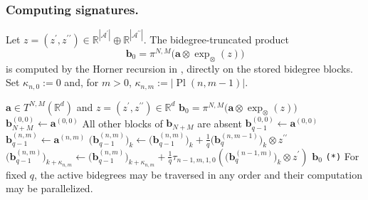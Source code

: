 \documentclass{amsart}
\theoremstyle{definition}
\theoremstyle{remark}
\begin{document}
\subsubsection{Computing signatures.}
Let $z=(z^{\prime},z^{\prime\prime})
    \in
    \mathbb{R}^{|\mathcal{A}^{\prime}|}
    \oplus
    \mathbb{R}^{|\mathcal{A}^{\prime\prime}|}.$
The bidegree-truncated product
\[
    \mathbf{b}_0
    =
    \pi^{N,M}
    \bigl(
        \mathbf{a}\otimes\exp_{\otimes}(z)
    \bigr)
\]
is computed by the Horner recursion in
, directly on the stored bidegree
blocks. Set $\kappa_{n,0}:=0$ and, for $m>0$,
$\kappa_{n,m}:=|\operatorname{Pl}(n,m-1)|$.

\begin{algorithm}[ht]
\caption{Horner recursion in ordered standard coordinates}
\label{alg:ordered_signature_horner}
\begingroup
\algrenewcommand{}
\begin{algorithmic}[1]
\Require
$\mathbf{a}\in T^{N,M}(\mathbb{R}^{d})$ and
$z=(z^{\prime},z^{\prime\prime})\in\mathbb{R}^{d}$
\Ensure
$\mathbf{b}_0
=
\pi^{N,M}\bigl(\mathbf{a}\otimes\exp_{\otimes}(z)\bigr)$
\State
$\mathbf{b}_{N+M}^{(0,0)}
\gets
\mathbf{a}^{(0,0)}$
\State
All other blocks of $\mathbf{b}_{N+M}$ are absent
    \State
    $\mathbf{b}_{q-1}^{(0,0)}
    \gets
    \mathbf{a}^{(0,0)}$
        \Comment{\texttt{(*)}}
        \State
        $\mathbf{b}_{q-1}^{(n,m)}
        \gets
        \mathbf{a}^{(n,m)}$
                \State
                $\displaystyle
                \bigl(\mathbf{b}_{q-1}^{(n,m)}\bigr)_k
                \gets
                \bigl(\mathbf{b}_{q-1}^{(n,m)}\bigr)_k
                +
                \frac{1}{q}
                \bigl(\mathbf{b}_{q}^{(n,m-1)}\bigr)_k
                \otimes z^{\prime\prime}$
            \EndFor
        \EndIf
                \State
                $\displaystyle
                \bigl(\mathbf{b}_{q-1}^{(n,m)}\bigr)_{k+\kappa_{n,m}}
                \gets
                \bigl(\mathbf{b}_{q-1}^{(n,m)}\bigr)_{k+\kappa_{n,m}}
                +
                \frac{1}{q}
                \tau_{n-1,m,1,0}
                \left(
                    \bigl(\mathbf{b}_{q}^{(n-1,m)}\bigr)_k
                    \otimes z^{\prime}
                \right)$
            \EndFor
        \EndIf
    \EndFor
\EndFor
\State \Return $\mathbf{b}_0$
\Statex
\Statex \texttt{(*)} For fixed $q$, the active bidegrees may be traversed
in any order and
their computation may be parallelized.
\end{algorithmic}
\endgroup
\end{algorithm}
\end{document}
